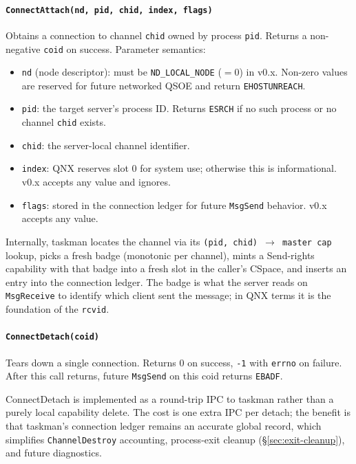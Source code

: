 \paragraph{\texttt{ConnectAttach(nd, pid, chid, index, flags)}}
Obtains a connection to channel \texttt{chid} owned by process
\texttt{pid}.  Returns a non-negative \texttt{coid} on success.
Parameter semantics:

\begin{itemize}
    \item \texttt{nd} (node descriptor): must be \texttt{ND\_LOCAL\_NODE}
          ($=0$) in v0.x.  Non-zero values are reserved for future
          networked QSOE and return \texttt{EHOSTUNREACH}.
    \item \texttt{pid}: the target server's process ID.  Returns
          \texttt{ESRCH} if no such process or no channel \texttt{chid}
          exists.
    \item \texttt{chid}: the server-local channel identifier.
    \item \texttt{index}: QNX reserves slot 0 for system use; otherwise
          this is informational.  v0.x accepts any value and ignores.
    \item \texttt{flags}: stored in the connection ledger for future
          \texttt{MsgSend} behavior.  v0.x accepts any value.
\end{itemize}

Internally, taskman locates the channel via its
\texttt{(pid, chid) $\to$ master cap} lookup, picks a fresh badge
(monotonic per channel), mints a Send-rights capability with that
badge into a fresh slot in the caller's CSpace, and inserts an entry
into the connection ledger.  The badge is what the server reads on
\texttt{MsgReceive} to identify which client sent the message; in QNX
terms it is the foundation of the \texttt{rcvid}.

\paragraph{\texttt{ConnectDetach(coid)}}
Tears down a single connection.  Returns 0 on success, \texttt{-1} with
\texttt{errno} on failure.  After this call returns, future
\texttt{MsgSend} on this coid returns \texttt{EBADF}.

ConnectDetach is implemented as a round-trip IPC to taskman rather than
a purely local capability delete.  The cost is one extra IPC per
detach; the benefit is that taskman's connection ledger remains an
accurate global record, which simplifies \texttt{ChannelDestroy}
accounting, process-exit cleanup (\S\ref{sec:exit-cleanup}), and
future diagnostics.

